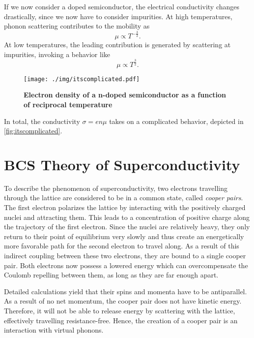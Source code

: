 If we now consider a doped semiconductor, the electrical conductivity changes drastically, since we now have to consider impurities.
At high temperatures, phonon scattering contributes to the mobility as
\begin{equation*}
	\mu \propto T^{-\frac{3}{2}}.
\end{equation*}
At low temperatures, the leading contribution is generated by scattering at impurities, invoking a behavior like
\begin{equation*}
	\mu \propto T^{\frac{3}{2}}.
\end{equation*}
\begin{figure}
	\centering
	\texttt{[image: ./img/itscomplicated.pdf]}
	\caption[Electron density of a n-doped semiconductor as a function of reciprocal temperature]{\textbf{Electron density of a n-doped semiconductor as a function of reciprocal temperature}}
	\label{fig:itscomplicated}
\end{figure}

In total, the conductivity $\sigma = en\mu$ takes on a complicated behavior, depicted in \autoref{fig:itscomplicated}.

\section{BCS Theory of Superconductivity}
To describe the phenomenon of superconductivity, two electrons travelling through the lattice are considered to be in a common state, called \textit{cooper pairs}.
The first electron polarizes the lattice by interacting with the positively charged nuclei and attracting them.
This leads to a concentration of positive charge along the trajectory of the first electron.
Since the nuclei are relatively heavy, they only return to their point of equilibrium very slowly and thus create an energetically more favorable path for the second electron to travel along.
As a result of this indirect coupling between these two electrons, they are bound to a single cooper pair.
Both electrons now possess a lowered energy which can overcompensate the Coulomb repelling between them, as long as they are far enough apart.

Detailed calculations yield that their spins and momenta have to be antiparallel.
As a result of no net momentum, the cooper pair does not have kinetic energy.
Therefore, it will not be able to release energy by scattering with the lattice, effectively travelling resistance-free.
Hence, the creation of a cooper pair is an interaction with virtual phonons.

